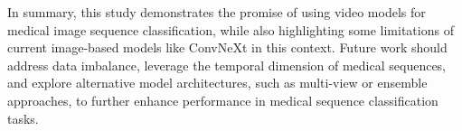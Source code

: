 In summary, this study demonstrates the promise of using video models for medical image sequence classification, while also highlighting some limitations of current image-based models like ConvNeXt in this context. Future work should address data imbalance, leverage the temporal dimension of medical sequences, and explore alternative model architectures, such as multi-view or ensemble approaches, to further enhance performance in medical sequence classification tasks.








